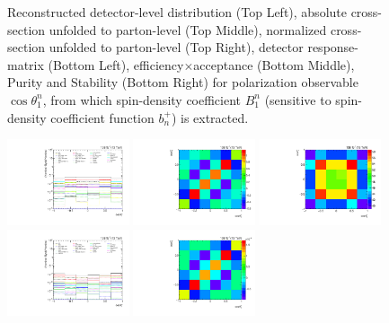 \begin{refsection}
\begin{figure}[htb]
\begin{center}
\caption{Reconstructed detector-level distribution (Top Left), absolute cross-section unfolded to parton-level (Top Middle), normalized cross-section unfolded to parton-level (Top Right), detector response-matrix (Bottom Left), efficiency$\times$acceptance (Bottom Middle), Purity and Stability (Bottom Right) for polarization observable $\cos\theta_{1}^{n}$, from which spin-density coefficient $B_{1}^{n}$ (sensitive to spin-density coefficient function $b_n^{+}$) is extracted.}
\label{fig:b1n}
\end{center}
\end{figure}
\clearpage
\begin{figure}[htb]
\begin{center}
 \includegraphics[width=0.32\textwidth]{fig_fullRun2UL/unfolding/combined/deltaSystCombinedlog_rebinnedB_b1n.pdf}
 \includegraphics[width=0.32\textwidth]{fig_fullRun2UL/unfolding/combined/StatCovMatrix_rebinnedB_b1n.pdf}
 \includegraphics[width=0.32\textwidth]{fig_fullRun2UL/unfolding/combined/TotalSystCovMatrix_rebinnedB_b1n.pdf} \\
 \includegraphics[width=0.32\textwidth]{fig_fullRun2UL/unfolding/combined/deltaSystCombinedlogNorm_rebinnedB_b1n.pdf}
 \includegraphics[width=0.32\textwidth]{fig_fullRun2UL/unfolding/combined/StatCovMatrixNorm_rebinnedB_b1n.pdf}

\end{center}
\end{figure}
\end{refsection}
